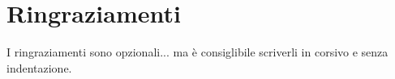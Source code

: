 \chapter*{Ringraziamenti}

\begin{itshape}
\setlength\parindent{0pt}

I ringraziamenti sono opzionali... ma è consiglibile scriverli in corsivo e senza indentazione.

\lipsum[1]

\end{itshape}
